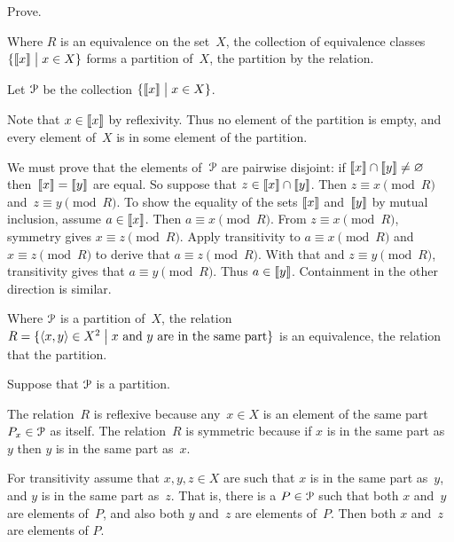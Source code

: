 \documentclass{ibl}  %
\begin{document}
\begin{problem} \label{ex:EquivClassesFormPartition}
Prove.
\begin{exes}
\begin{exercise} 
  Where $R$ is an equivalence on the set~$X$, 
  the collection of equivalence classes 
  $\{\llbracket x \rrbracket \bigm| x\in X\}$ forms a partition of~$X$,
  the partition  by the relation.
\end{exercise}
\begin{answer}
  Let $\EuScript{P}$ be the collection $\{\llbracket x \rrbracket \bigm| x\in X\}$.
 
  Note that $x\in\llbracket x \rrbracket$ by reflexivity.
  Thus no element of the partition is empty, and 
  every element of~$X$ is in some element of the partition.

  We must prove that the elements of~$\EuScript{P}$ are pairwise disjoint:
  if $\llbracket x \rrbracket\cap\llbracket y \rrbracket\neq\varnothing$
  then~$\llbracket x \rrbracket=\llbracket y \rrbracket$ are equal.
  So suppose that $z\in\llbracket x \rrbracket\cap\llbracket y \rrbracket$.
  Then $z\equiv x\pmod R$ and~$z\equiv y\pmod R$.
  To show the equality of the sets $\llbracket x \rrbracket$ and~$\llbracket y \rrbracket$ 
  by mutual inclusion, assume $a\in\llbracket x \rrbracket$.
  Then $a\equiv x\pmod R$.
  From $z\equiv x\pmod R$, symmetry gives $x\equiv z\pmod R$.
  Apply transitivity to $a\equiv x\pmod R$ and~$x\equiv z\pmod R$ to
  derive that $a\equiv z\pmod R$.
  With that and $z\equiv y\pmod R$, transitivity gives
  that $a\equiv y\pmod R$. 
  Thus $a\in\llbracket y \rrbracket$.
  Containment in the other direction is similar.    
\end{answer}
\begin{exercise} 
  Where $\EuScript{P}$ is a partition of~$X$, 
  the relation 
  $R=\{\langle x,y\rangle\in X^2 \bigm| 
            \text{$x$ and~$y$ are in the same part}\}$ 
  is an equivalence, 
  the relation that  the partition. 
\end{exercise}
\begin{answer}
  Suppose that $\EuScript{P}$ is a partition. 

  The relation~$R$ is reflexive because any~$x\in X$ is an element of
  the same part $P_{x}\in\EuScript{P}$ as itself.
  The relation~$R$ is symmetric because if $x$ is in the same part as~$y$
  then $y$ is in the same part as~$x$.

  For transitivity assume that $x,y,z\in X$ are such that 
  $x$ is in the same part as~$y$, and 
  $y$ is in the same part as~$z$.
  That is, there is a $P\in\EuScript{P}$ such that
  both $x$ and~$y$ are elements of~$P$, 
  and also both $y$ and~$z$ are elements of~$P$.
  Then both $x$ and~$z$ are elements of $P$.  
\end{answer}
\end{exes}
\end{problem}
\end{document}
